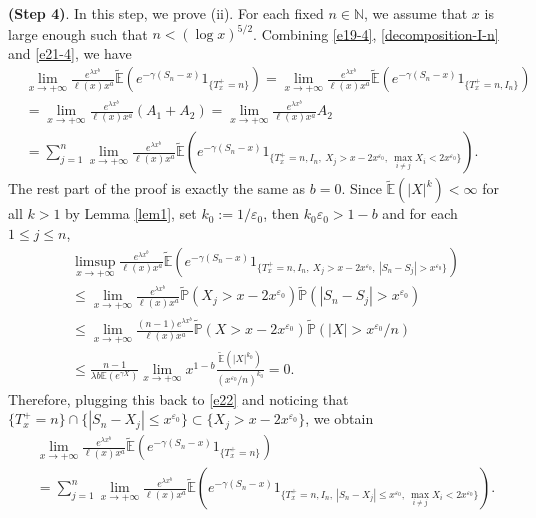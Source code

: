 \documentclass[11pt]{article}
\numberwithin{equation}{section}
\begin{document}
\noindent
{\bf(Step 4)}. In this step, we prove (ii). For each fixed $n\in \mathbb{N}$, we assume that $x$ is large enough such that $n<(\log x)^{5/2}$.  Combining \eqref{e19-4}, \eqref{decomposition-I-n} and \eqref{e21-4}, we have 
\begin{align}\label{e22}
	& \lim_{x\to+\infty} \frac{  e^{\lambda x^b} }{\ell(x) x^a } \widetilde{\mathbb{E}}\left(e^{-\gamma (S_n-x)}1_{\{T_x^+=n\}}\right) = \lim_{x\to+\infty} \frac{  e^{\lambda x^b} }{\ell(x) x^a } \widetilde{\mathbb{E}}\left(e^{-\gamma (S_n-x)}1_{\{T_x^+=n, I_n \}}\right) \nonumber\\
	& =  \lim_{x\to+\infty} \frac{  e^{\lambda x^b}}{\ell(x) x^a } (A_1+ A_2)=  \lim_{x\to+\infty} \frac{  e^{\lambda x^b} }{\ell(x) x^a } A_2  \nonumber\\
	& = \sum_{j=1}^n  \lim_{x\to+\infty} \frac{ e^{\lambda x^b}}{\ell(x) x^a } \widetilde{\mathbb{E}}\left(e^{-\gamma (S_n-x)}1_{\{T_x^+=n, I_n , \  X_j>x-2x^{\varepsilon_0},\ \max_{i\neq j} X_i< 2x^{\varepsilon_0}\}}\right).
\end{align}
The rest part of the proof is exactly the same as $b=0$. 
Since  $\widetilde{\mathbb{E}}(|X|^k)<\infty$ for all $k>1$ by Lemma \ref{lem1},  set $k_0:= 1/\varepsilon_0$, then $k_0\varepsilon_0 > 1-b$ and for each $1\leq j\leq n$, 
\begin{align}\label{e27-1}
	 &\limsup_{x\to+\infty}  \frac{ e^{\lambda x^b}}{\ell(x) x^a } \widetilde{\mathbb{E}}\left(e^{-\gamma (S_n-x)}1_{\{T_x^+=n, I_n , \  X_j>x-2x^{\varepsilon_0},\ |S_n- S_j|>x^{\varepsilon_0}\}}\right) \nonumber\\
	& \leq \lim_{x\to+\infty}  \frac{  e^{\lambda x^b} }{\ell(x) x^a } \widetilde{\mathbb{P}}\left( X_j>x-2x^{\varepsilon_0}\right) \widetilde{\mathbb{P}} \left(|S_n-S_j|>x^{\varepsilon_0}\right)\nonumber\\
	& \leq  \lim_{x\to+\infty}  \frac{  (n-1) e^{\lambda x^b}}{\ell(x) x^a } \widetilde{\mathbb{P}}\left( X>x-2x^{\varepsilon_0}\right) \widetilde{\mathbb{P}} \left(|X|>x^{\varepsilon_0}/n \right)  \nonumber\\
	& \leq  \frac{n-1}{\lambda b \mathbb{E}(e^{\gamma X})} \lim_{x\to+\infty} x^{1-b} \frac{\widetilde{\mathbb{E}}(|X|^{k_0})}{(x^{\varepsilon_0}/n)^{k_0}}=0.
\end{align}
Therefore, plugging this back to \eqref{e22} and noticing that $\{T_x^+=n\}\cap\{|S_n-X_j|\leq x^{\varepsilon_0}\}\subset \{X_j>x-2x^{\varepsilon_0}\}$,  we obtain
\begin{align}\label{e22-1}
	& \lim_{x\to+\infty} \frac{  e^{\lambda x^b} }{\ell(x) x^a } \widetilde{\mathbb{E}}\left(e^{-\gamma (S_n-x)}1_{\{T_x^+=n\}}\right)   \nonumber\\
	& =\sum_{j=1}^n  \lim_{x\to+\infty} \frac{  e^{\lambda x^b} }{\ell(x) x^a } \widetilde{\mathbb{E}}\left(e^{-\gamma (S_n-x)}1_{\{T_x^+=n, I_n , \  |S_n-X_j|\leq x^{\varepsilon_0},\ \max_{i\neq j} X_i< 2x^{\varepsilon_0}\}}\right).
\end{align}
\end{document}
